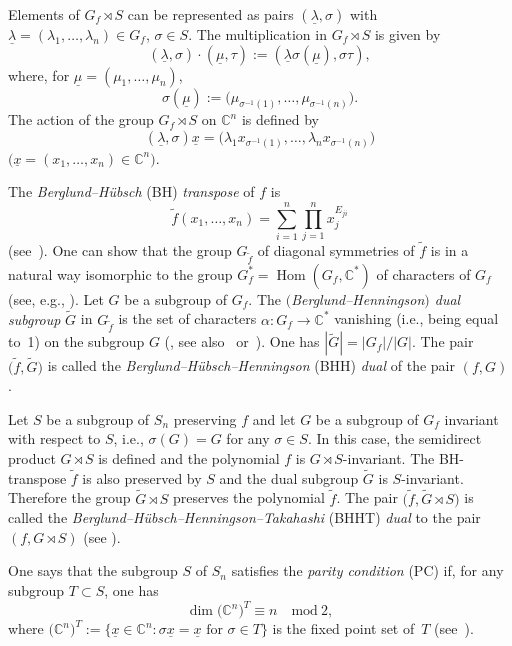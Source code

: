 \documentclass[pdftex]{sigma}
\numberwithin{equation}{section}
\begin{document}
\begin{Remark}Elements of $G_f \rtimes S$ can be represented as pairs $(\underline{\lambda}, \sigma)$ with
$\underline{\lambda}=(\lambda_1, \dots , \lambda_n) \in G_f$, $\sigma \in S$. The multiplication in
$G_f \rtimes S$ is given by
\[
(\underline{\lambda}, \sigma) \cdot (\underline{\mu}, \tau) :=
(\underline{\lambda} \sigma(\underline{\mu}), \sigma \tau) ,
\]
where, for $\underline{\mu}=(\mu_1, \dots , \mu_n)$,
\[
\sigma(\underline{\mu}):= \big(\mu_{\sigma^{-1}(1)}, \dots , \mu_{\sigma^{-1}(n)}\big) .
\]
The action of the group $G_f \rtimes S$ on ${\mathbb C}^n$ is defined by
\[
(\underline{\lambda}, \sigma)\underline{x} = \big(\lambda_1x_{\sigma^{-1}(1)}, \dots , \lambda_nx_{\sigma^{-1}(n)}\big)
\]
$\big(\underline{x}=(x_1, \dots , x_n) \in {\mathbb C}^n\big)$.
\end{Remark}

The {\em Berglund--H\"ubsch} (BH) {\em transpose} of $f$ is
\[
\widetilde{f}(x_1, \dots, x_n)=\sum_{i=1}^n \prod_{j=1}^n x_j^{E_{ji}}
\]
(see~\cite{BH1}). One can show that the group $G_{\widetilde{f}}$ of diagonal symmetries of $\widetilde{f}$ is in a natural way isomorphic
to the group $G_f^*=\operatorname{Hom}(G_f,{\mathbb C}^*)$ of characters of $G_f$ (see, e.g., \cite[Proposition~2]{EG-BLMS}). Let $G$ be a subgroup of $G_f$. The {\em $($Berglund--Henningson$)$ dual subgroup} $\widetilde{G}$ in $G_{\widetilde{f}}$ is the set of characters $\alpha\colon G_f \to {\mathbb C}^*$ vanishing (i.e., being equal to~1) on the subgroup $G$ (\cite{BH2}, see also~\cite{Krawitz-thesis} or~\cite{Krawitz}). One has $|\widetilde{G}|=|G_f|/|G|$. The pair $\big(\widetilde{f},\widetilde{G}\big)$ is called the {\em Berglund--H\"ubsch--Henningson} (BHH) {\em dual}
of the pair $(f,G)$.

Let $S$ be a subgroup of $S_n$ preserving $f$ and let $G$ be a subgroup of $G_f$ invariant with respect to $S$, i.e., $\sigma(G)=G$ for any $\sigma \in S$. In this case, the semidirect product $G \rtimes S$ is defined and the polynomial $f$ is $G \rtimes S$-invariant. The BH-transpose $\widetilde{f}$ is also preserved by $S$ and the dual subgroup $\widetilde{G}$ is $S$-invariant. Therefore the group $\widetilde{G} \rtimes S$ preserves the polynomial $\widetilde{f}$. The pair $\big(\widetilde{f},\widetilde{G}\rtimes S\big)$ is called the {\em Berglund--H\"ubsch--Henningson--Takahashi} (BHHT) {\em dual} to the pair $(f,G\rtimes S)$ (see \cite{EG-IMRN}).

One says that the subgroup $S$ of $S_n$ satisfies the {\em parity condition} (PC) if, for any subgroup
$T \subset S$, one has
\[
\dim\big({\mathbb C}^n\big)^T \equiv n \quad \mbox{mod}\ 2,
\]
where $\big({\mathbb C}^n\big)^T:= \big\{ \underline{x} \in {\mathbb C}^n \colon \sigma \underline{x} =
\underline{x} \mbox{ for } \sigma \in T \big\}$ is the fixed point set of~$T$ (see~\cite{EG-IMRN}).
\end{document}
